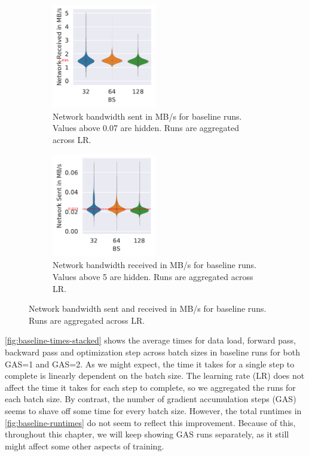 \begin{figure}[ht]
    \centering
    \begin{subfigure}[t]{0.475 \textwidth}
        \centering
        \caption{Network bandwidth sent in MB/s for baseline runs. Values above 0.07 are hidden. Runs are aggregated across LR.}
        \label{fig:net-sent_baseline}
        \includegraphics[width=0.5\textwidth]{./figures/06_net-recv_baseline-16vCPUs-GAS-1.pdf}
    \end{subfigure}
    \centering
    \begin{subfigure}[t]{0.475 \textwidth}
        \centering
        \caption{Network bandwidth received in MB/s for baseline runs. Values above 5 are hidden. Runs are aggregated across LR.}
        \label{fig:net-recv_baseline}
        \includegraphics[width=0.5\textwidth]{./figures/06_net-sent_baseline-16vCPUs-GAS-1.pdf}
    \end{subfigure}%
    \hfill
    \caption{Network bandwidth sent and received in MB/s for baseline runs. Runs are aggregated across LR.}
\end{figure}

\autoref{fig:baseline-times-stacked} shows the average times for data load, forward pass, backward pass and optimization step across batch sizes in baseline runs for both GAS=1 and GAS=2.
As we might expect, the time it takes for a single step to complete is linearly dependent on the batch size.
The learning rate (LR) does not affect the time it takes for each step to complete, so we aggregated the runs for each batch size.
By contrast, the number of gradient accumulation steps (GAS) seems to shave off some time for every batch size.
However, the total runtimes in \autoref{fig:baseline-runtimes} do not seem to reflect this improvement.
Because of this, throughout this chapter, we will keep showing GAS runs separately, as it still might affect some other aspects of training.

